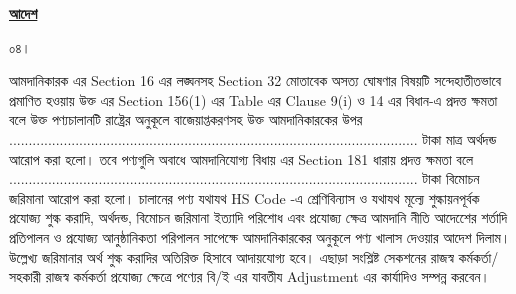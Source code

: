 \documentclass[12pt]{article}
\begin{document}
\noindent
\vspace*{4in}
\begin{center}
\textbf{\underline{আদেশ}}
\end{center}
\begin{minipage}[t]{0.05\linewidth}
০৪।
\end{minipage}
\begin{minipage}[t]{0.95\linewidth}
আমদানিকারক {\tca} এর Section 16
এর লঙ্ঘনসহ Section 32 মোতাবেক
অসত্য ঘোষণার বিষয়টি সন্দেহাতীতভাবে প্রমাণিত
হওয়ায় উক্ত {\tca} এর Section 156(1) এর
Table এর Clause 9(i) ও 14 এর বিধান-এ প্রদত্ত
ক্ষমতা বলে উক্ত পণ্যচালানটি
রাষ্ট্রের অনুকূলে বাজেয়াপ্তকরণসহ উক্ত আমদানিকারকের
উপর
......................................................................................................... টাকা
মাত্র অর্থদন্ড আরোপ করা হলো। তবে পণ্যগুলি অবাধে আমদানিযোগ্য
বিধায় {\tca} এর Section 181 ধারায় প্রদত্ত ক্ষমতা
বলে
......................................................................................................... টাকা
বিমোচন জরিমানা আরোপ করা হলো।
চালানের পণ্য যথাযথ HS Code -এ শ্রেণিবিন্যাস ও যথাযথ
মূল্যে শুল্কায়নপূর্বক প্রযোজ্য শুল্ক করাদি, অর্থদন্ড, বিমোচন জরিমানা
ইত্যাদি পরিশোধ এবং প্রযোজ্য ক্ষেত্র আমদানি নীতি আদেশেের
শর্তাদি প্রতিপালন ও প্রযোজ্য আনুষ্ঠানিকতা পরিপালন সাপেক্ষে
আমদানিকারকের অনুকূলে পণ্য খালাস দেওয়ার আদেশ দিলাম।
উল্লেখ্য জরিমানার অর্থ শুল্ক করাদির অতিরিক্ত হিসাবে আদায়যোগ্য
হবে। এছাড়া সংশ্লিষ্ট সেকশনের রাজস্ব কর্মকর্তা/সহকারী রাজস্ব কর্মকর্তা
প্রযোজ্য ক্ষেত্রে পণ্যের বি/ই এর যাবতীয Adjustment এর কার্যাদিও সম্পন্ন করবেন।
\\
\\
\\
\\
\\
\end{minipage}
\end{document}
